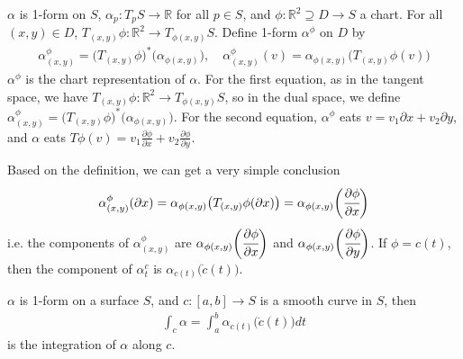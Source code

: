 \documentclass[10pt]{article}
\begin{document}
        \begin{definition}
            $\alpha$ is 1-form on $S$, $\alpha_p: T_pS\rightarrow\mathbb{R}$ for all $p\in S$, and $\phi: \mathbb{R}^2\supseteq D\rightarrow S$ a chart. For all $(x,y)\in D$, $T_{(x,y)}\phi: \mathbb{R}^2\rightarrow T_{\phi(x, y)}S$. Define 1-form $\alpha^{\phi}$ on $D$ by
            \begin{equation*}
                \begin{aligned}
                    \alpha_{(x,y)}^{\phi} = \big(T_{(x,y)}\phi\big)^*\big(\alpha_{\phi(x,y)}\big), \quad \alpha_{(x,y)}^{\phi}(v) = \alpha_{\phi(x,y)}\big( T_{(x,y)}\phi(v) \big)
                \end{aligned}
            \end{equation*}
            $\alpha^\phi$ is the chart representation of $\alpha$. For the first equation, as in the tangent space, we have $T_{(x,y)}\phi: \mathbb{R}^2\rightarrow T_{\phi(x,y)}S$, so in the dual space, we define $\alpha_{(x,y)}^{\phi} = \big(T_{(x,y)}\phi\big)^*\big(\alpha_{\phi(x,y)}\big)$. For the second equation, $\alpha^\phi$ eats $v = v_1\partial x + v_2\partial y$, and $\alpha$ eats $T\phi(v) = v_1\frac{\partial\phi}{\partial x} + v_2\frac{\partial\phi}{\partial y}$.
        \end{definition}
    
        Based on the definition, we can get a very simple conclusion
        \begin{equation*}
            \begin{aligned}
                \alpha_{(x,y)}^{\phi}(\partial x) = \alpha_{\phi(x,y)}\big( T_{(x,y)}\phi(\partial x) \big) = \alpha_{\phi(x,y)}\bigg( \cfrac{\partial\phi}{\partial x} \bigg)
            \end{aligned}
        \end{equation*}
        i.e. the components of $\alpha_{(x,y)}^\phi$ are $\alpha_{\phi(x,y)}\bigg( \cfrac{\partial\phi}{\partial x} \bigg)$ and $\alpha_{\phi(x,y)}\bigg( \cfrac{\partial\phi}{\partial y} \bigg)$. If $\phi = c(t)$, then the component of $\alpha_t^{c}$ is $\alpha_{c(t)}\big(\dot{c}(t)\big)$.
    
        \begin{definition}[Integration]
            $\alpha$ is 1-form on a surface $S$, and $c: [a, b]\rightarrow S$ is a smooth curve in $S$, then
            \begin{equation*}
                \begin{aligned}
                    \int_{c}\alpha = \int_{a}^{b}\alpha_{c(t)}\big(\dot{c}(t)\big) dt
                \end{aligned}
            \end{equation*}
            is the integration of $\alpha$ along $c$.
        \end{definition}
    
\end{document}

